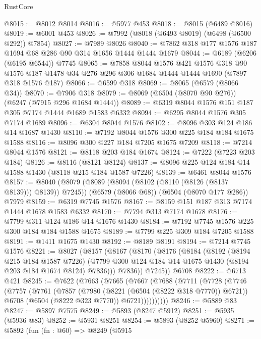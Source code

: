 \begin{lexlean}{RustCore}
\begin{coremodule}
@8015 := @8012 @8014
@8016 := @5977 @453
@8018 := @8015 (@6489 @8016)
@8019 := @6001 @453
@8026 := @7992 (@8018 (@6493 @8019) (@6498 (@6500 @292)) @7854)
@8027 := @7989 @8026
@8040 := @7862 @318 @177 @1576 @187 @1694 @68 @286 @90 @314 @1656 @1444 @1444 @1679
@8044 := @6189 (@6206 (@6195 @6544)) @7745
@8065 := @7858
    @8044
    @1576
    @421
    @1576
    @318
    @90
    @1576
    @187
    @1478
    @34
    @276
    @296
    @306
    @1684
    @1444
    @1444
    @1690
    (@7897 @318 @1576 @187)
@8066 := @6599 @318
@8069 := @8065 (@6579 (@8066 @34))
@8070 := @7906 @318
@8079 := @8069 (@6504 (@8070 @90 @276)) (@6247 (@7915 @296 @1684 @1444))
@8089 := @6319 @8044 @1576 @151 @187 @305 @7174 @1444 @1689 @1583 @6332
@8094 := @6295 @8044 @1576 @305 @7174 @1689
@8096 := @6304 @8044 @1576
@8102 := @8096 @303 @124 @186 @14 @1687 @1430
@8110 := @7192 @8044 @1576 @300 @225 @184 @184 @1675 @1588
@8116 := @8096 @300 @227 @184 @7205 @1675 @7209
@8118 := @7214 @8044 @1576
@8121 := @8118 @203 @184 @1674
@8124 := @7222 (@7223 @203 @184)
@8126 := @8116 (@8121 @8124)
@8137 := @8096 @225 @124 @184 @14 @1588 @1430 (@8118 @215 @184 @1587 @7226)
@8139 := @6461 @8044 @1576
@8157 := @8040
    (@8079 (@8089 (@8094 (@8102 (@8110 (@8126 (@8137 @8139))) @8139)) @7245))
    (@6579 (@8066 @68))
    (@6504 (@8070 @177 @286))
    @7979
@8159 := @6319 @7745 @1576
@8167 := @8159 @151 @187 @313 @7174 @1444 @1678 @1583 @6332
@8170 := @7794 @313 @7174 @1678
@8176 := @7799 @311 @124 @186 @14 @1676 @1430
@8184 := @7192 @7745 @1576 @225 @300 @184 @184 @1588 @1675
@8189 := @7799 @225 @309 @184 @7205 @1588
@8191 := @1411 @1675 @1430
@8192 := @8189 @8191
@8194 := @7214 @7745 @1576
@8221 := @8027
    (@8157
      (@8167
        (@8170
          (@8176
            (@8184
              (@8192
                (@8194 @215 @184 @1587 @7226)
                (@7799 @300 @124 @184 @14 @1675 @1430 (@8194 @203 @184 @1674 @8124) @7836)))
            @7836))
        @7245))
    @6708
@8222 := @6713 @421
@8245 := @7622
    (@7663
      (@7665
        (@7667
          (@7688
            (@7711
              (@7728
                (@7746
                  (@7757
                    (@7761
                      (@7857
                        (@7980 (@8221 (@6504 (@8222 @318 @7770)) @6721))
                        @6708
                        (@6504 (@8222 @323 @7770))
                        @6721))))))))))
@8246 := @5889 @83
@8247 := @5897 @7575
@8249 := @5893 (@8247 @5912)
@8251 := @5935 (@5936 @83)
@8252 := @5931 @8251
@8254 := @5893 (@8252 @5960)
@8271 := @5892
    (fun (fn : @60) =>
    @8249
      (@5915

\end{coremodule}
\end{lexlean}
